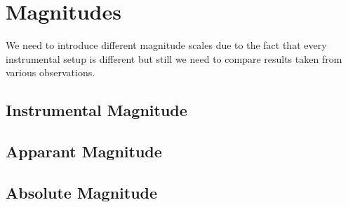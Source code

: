 \section{Magnitudes}
We need to introduce different magnitude scales due to the fact that every instrumental setup is different but still we need to compare results taken from various observations.
\subsection{Instrumental Magnitude}

\subsection{Apparant Magnitude}

\subsection{Absolute Magnitude}